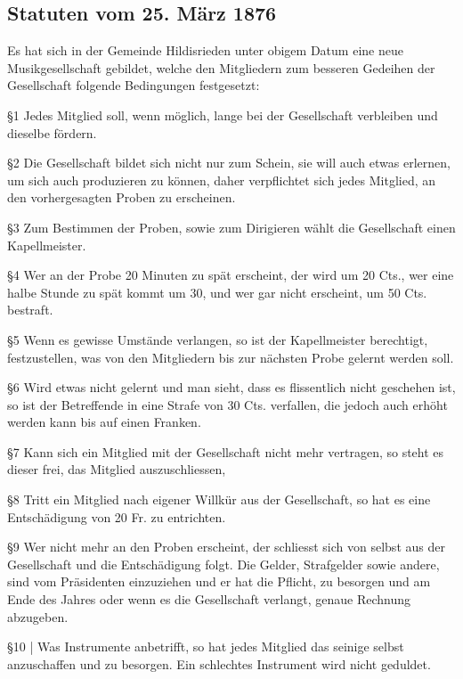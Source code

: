 \begin{history}

    \subsection{Statuten vom 25. März 1876}

    Es hat sich in der Gemeinde Hildisrieden unter obigem Datum eine neue
    Musikgesellschaft gebildet, welche den Mitgliedern zum besseren Gedeihen der
    Gesellschaft folgende Bedingungen festgesetzt:

    \S1 Jedes Mitglied soll, wenn möglich, lange bei der Gesellschaft verbleiben
    und dieselbe fördern.

    \S2 Die Gesellschaft bildet sich nicht nur zum Schein, sie will auch etwas
    erlernen, um sich auch produzieren zu können, daher verpflichtet sich jedes
    Mitglied, an den vorhergesagten Proben zu erscheinen.

    \S3 Zum Bestimmen der Proben, sowie zum Dirigieren wählt die Gesellschaft
    einen Kapellmeister.

    \S4 Wer an der Probe 20 Minuten zu spät erscheint, der wird um 20 Cts., wer
    eine halbe Stunde zu spät kommt um 30, und wer gar nicht erscheint, um 50
    Cts. bestraft.

    \S5 Wenn es gewisse Umstände verlangen, so ist der Kapellmeister berechtigt,
    festzustellen, was von den Mitgliedern bis zur nächsten Probe gelernt werden
    soll.

    \S6 Wird etwas nicht gelernt und man sieht, dass es flissentlich nicht
    geschehen ist, so ist der Betreffende in eine Strafe von 30 Cts. verfallen,
    die jedoch auch erhöht werden kann bis auf einen Franken.

    \S7 Kann sich ein Mitglied mit der Gesellschaft nicht mehr vertragen, so
    steht es dieser frei, das Mitglied auszuschliessen,

    \S8 Tritt ein Mitglied nach eigener Willkür aus der Gesellschaft, so hat es
    eine Entschädigung von 20 Fr. zu entrichten.

    \S9 Wer nicht mehr an den Proben erscheint, der schliesst sich von selbst
    aus der Gesellschaft und die Entschädigung folgt. Die Gelder, Strafgelder
    sowie andere, sind vom Präsidenten einzuziehen und er hat die Pflicht, zu
    besorgen und am Ende des Jahres oder wenn es die Gesellschaft verlangt,
    genaue Rechnung abzugeben.

    \S10 | Was Instrumente anbetrifft, so hat jedes Mitglied das seinige selbst
    anzuschaffen und zu besorgen. Ein schlechtes Instrument wird nicht geduldet.


\end{history}
